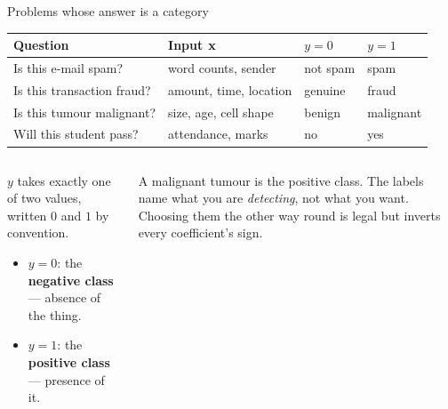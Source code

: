 \documentclass[aspectratio=169,10pt]{beamer}
\begin{document}
\begin{frame}{Problems whose answer is a category}
  \footnotesize
  \begin{center}
  \renewcommand{\arraystretch}{1.2}
  \begin{tabular}{@{}L{4.0cm}L{3.6cm}L{1.6cm}L{1.6cm}@{}}
    \toprule
    \textbf{Question} & \textbf{Input $\mathbf{x}$} & \textbf{$y=0$} & \textbf{$y=1$}\\
    \midrule
    Is this e-mail spam?          & word counts, sender    & not spam & spam\\
    Is this transaction fraud?    & amount, time, location & genuine  & fraud\\
    Is this tumour malignant?     & size, age, cell shape  & benign   & malignant\\
    Will this student pass?       & attendance, marks      & no       & yes\\
    \bottomrule
  \end{tabular}
  \end{center}
  \vspace{1mm}
  \begin{columns}[T,onlytextwidth]
    \begin{column}{0.5\textwidth}
      \begin{defnbox}
        \small $y$ takes exactly one of two values, written $0$ and $1$ by convention.
        \begin{itemize}
          \item $y=0$: the \textbf{negative class} --- absence of the thing.
          \item $y=1$: the \textbf{positive class} --- presence of it.
        \end{itemize}
      \end{defnbox}
    \end{column}
    \begin{column}{0.46\textwidth}
      \begin{pitfall}
        \small
        A malignant tumour is the positive class. The labels name what you are
        \emph{detecting}, not what you want. Choosing them the other way round is legal but
        inverts every coefficient's sign.
      \end{pitfall}
    \end{column}
  \end{columns}
\end{frame}
\end{document}
